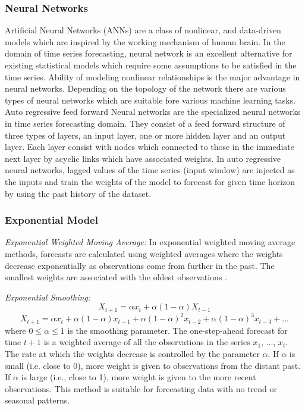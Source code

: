 \subsubsection{Neural Networks}
Artificial Neural Networks (ANNs) are a class of nonlinear, and data-driven models which are inspired by the working mechanism of human brain. In the domain of time series forecasting, neural network is an excellent alternative for existing statistical models which require some assumptions to be satisfied in the time series. Ability of modeling nonlinear relationships is the major advantage in neural networks. Depending on the topology of the network there are various types of neural networks which are suitable fore various machine learning tasks.  Auto regressive feed forward Neural networks are the specialized neural networks in time series forecasting domain. They consist of a feed forward structure of three types of layers,  an input layer, one or more hidden layer and an output layer. Each layer consist with nodes which connected to those in the immediate next layer by acyclic links which have associated weights. In auto regressive neural networks, lagged values of the time series (input window) are injected as the inputs and train the weights of the model to forecast for given time horizon by using the past history of the dataset. 


\subsubsection{Exponential Model}
\noindent
\textit{Exponential Weighted Moving Average:}
In exponential weighted moving average methods, forecasts are calculated using weighted averages where the weights decrease exponentially as observations come from further in the past. The smallest weights are associated with the oldest observations \cite{Forecasting_OTexts} \cite{StatSoft} \cite{STAT510}.

\noindent
\textit{Exponential Smoothing:}
	$$X_{t+1}=\alpha x_t +\alpha(1-\alpha)X_{t-1}$$
	$$X_{t+1}=\alpha x_t +\alpha(1-\alpha)x_{t-1}+\alpha(1-\alpha)^2x_{t-2}+\alpha(1-\alpha)^3x_{t-3}+...$$
where $0\leq \alpha \leq 1$ is the smoothing parameter. The one-step-ahead forecast for time $t+1$ is a weighted average of all the observations in the series $x_1$, ..., $x_t$. The rate at which the weights decrease is controlled by the parameter $\alpha$. If $\alpha$ is small (i.e. close to 0), more weight is given to observations from the distant past. If $\alpha$ is large (i.e., close to 1), more weight is given to the more recent observations. This method is suitable for forecasting data with no trend or seasonal patterns.

